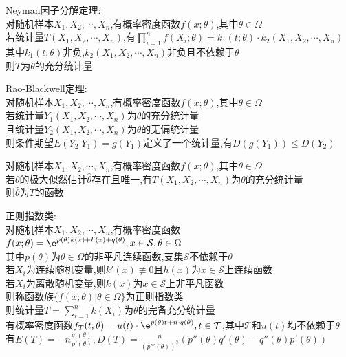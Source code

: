 \begin{dingli}
Neyman因子分解定理:\\
对随机样本$X_1,X_2,\cdots,X_n$,有概率密度函数$f(x;\theta)$,其中$\theta\in\Omega$\\
若统计量$T(X_1,X_2,\cdots,X_n)$,有$\prod\limits_{i=1}^{n}f(X_i;\theta)=k_1(t;\theta)\cdot k_2(X_1,X_2,\cdots,X_n)$\\
其中$k_1(t;\theta)$非负,$k_2(X_1,X_2,\cdots,X_n)$非负且不依赖于$\theta$\\
则$T$为$\theta$的充分统计量
\end{dingli}

\begin{dingli}
Rao-Blackwell定理:\\
对随机样本$X_1,X_2,\cdots,X_n$,有概率密度函数$f(x;\theta)$,其中$\theta\in\Omega$\\
若统计量$Y_1(X_1,X_2,\cdots,X_n)$为$\theta$的充分统计量\\
且统计量$Y_2(X_1,X_2,\cdots,X_n)$为$\theta$的无偏统计量\\
则条件期望$E(Y_2|Y_1)=g(Y_1)$定义了一个统计量,有$D(g(Y_1))\leq D(Y_2)$
\end{dingli}

\begin{dingli}
对随机样本$X_1,X_2,\cdots,X_n$,有概率密度函数$f(x;\theta)$,其中$\theta\in\Omega$\\
若$\theta$的极大似然估计$\hat{\theta}$存在且唯一,有$T(X_1,X_2,\cdots,X_n)$为$\theta$的充分统计量\\
则$\hat{\theta}$为$T$的函数
\end{dingli}

\begin{dingli}
正则指数类:\\
对随机样本$X_1,X_2,\cdots,X_n$,有概率密度函数$f(x;\theta)=\e^{p(\theta)k(x)+h(x)+q(\theta)},x\in \mathcal{S},\theta\in\Omega$\\
其中$p(\theta)$为$\theta\in\Omega$的非平凡连续函数,支集$\mathcal{S}$不依赖于$\theta$\\
若$X_i$为连续随机变量,则$k'(x)\not\equiv 0$且$h(x)$为$x\in\mathcal{S}$上连续函数\\
若$X_i$为离散随机变量,则$k(x)$为$x\in\mathcal{S}$上非平凡函数\\
则称函数族$\{f(x;\theta)|\theta\in\Omega\}$为正则指数类\\
则统计量$T=\sum\limits_{i=1}^{n}k(X_i)$为$\theta$的完备充分统计量\\
有概率密度函数$f_{T}(t;\theta)=u(t)\cdot\e^{p(\theta)t+n\cdot q(\theta)},t\in\mathcal{T}$,其中$\mathcal{T}$和$u(t)$均不依赖于$\theta$\\
有$E(T)=-n\frac{q'(\theta)}{p'(\theta)},D(T)=\frac{n}{(p'''(\theta))^3}(p''(\theta)q'(\theta)-q''(\theta)p'(\theta))$
\end{dingli}

